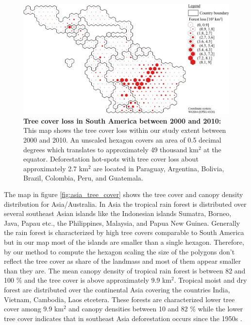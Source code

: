 			\begin{figure}[ht]
				\centering
				\includegraphics[scale=1]{img/americas_loss_frameless}
				\caption[Tree cover loss in South America between 2000 and 2010]{\textbf{Tree cover loss in South America between 2000 and 2010:} This map shows the tree cover loss within our study extent between 2000 and 2010. An unscaled hexagon covers an area of 0.5 decimal degrees which translates to approximately 49 thousand km$^2$ at the equator. Deforestation hot-spots with tree cover loss about approximately 2.7 km$^2$ are located in Paraguay, Argentina, Bolivia, Brazil, Colombia, Peru, and Guatemala.}
				\label{fig:americas_loss}
			\end{figure}

			The map in figure \ref{fig:asia_tree_cover} shows the tree cover and canopy density distribution for Asia/Australia. In Asia the tropical rain forest is distributed over several southeast Asian islands like the Indonesian islands Sumatra, Borneo, Java, Papau etc., the Philippines, Malaysia, and Papua New Guinea. Generally the rain forest is characterized by high tree covers comparable to South America but in our map most of the islands are smaller than a single hexagon. Therefore, by our method to compute the hexagon scaling the size of the polygons don't reflect the tree cover as share of the landmass and most of them appear smaller than they are. The mean canopy density of tropical rain forest is between 82 and 100 \% and the tree cover is above approximately 9.9 km$^2$. Tropical moist and dry forest are distributed over the continental Asia covering the countries India, Vietnam, Cambodia, Laos etcetera. These forests are characterized lower tree cover among 9.9 km$^2$ and canopy densities between 10 and 82 \% while the lower tree cover indicates that in southeast Asia deforestation occurs since the 1950s \cite{Kummer1994}. 

